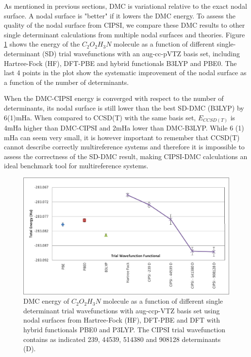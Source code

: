 As mentioned in previous sections, DMC is variational relative to the
exact nodal surface. A nodal surface is "better" if it lowers the DMC
energy. To assess the quality of the nodal surface from CIPSI, we
compare these DMC results to other single determinant calculations
from multiple nodal surfaces and theories. Figure \ref{fig:CIPSI-DMC}
shows the energy of the $C_2O_2H_3N$ molecule as a function of
different single-determinant (SD) trial wavefunctions with an
aug-cc-pVTZ basis set, including Hartree-Fock (HF), DFT-PBE and hybrid
functionals B3LYP and PBE0. The last 4 points in the plot show the
systematic improvement of the nodal surface as a function of the
number of determinants. 

When the DMC-CIPSI energy is converged with respect to the number of
determinants, its nodal surface is still lower than the best SD-DMC
(B3LYP) by 6(1)mHa. When compared to CCSD(T) with the same basis set,
$E_{CCSD(T)}$ is 4mHa higher than DMC-CIPSI and 2mHa lower than
DMC-B3LYP. While 6 (1) mHa can seem very small, it is however
important to remember that CCSD(T) cannot describe correctly
multireference systems and therefore it is impossible to assess the
correctness of the SD-DMC result, making CIPSI-DMC calculations an
ideal benchmark tool for multireference systems.

\begin{figure}
\begin{center}
\includegraphics[trim = 2mm 2mm 2mm 2mm, clip,width=0.9
\columnwidth]{figures/DMC-Multidet.jpg}
\end{center}
\caption{DMC energy of $C_2O_2H_3N$ molecule as a function of different single determinant trial wavefunctions with aug-ccp-VTZ basis set using nodal surfaces from Hartree-Fock (HF), DFT-PBE and DFT with hybrid functionals PBE0 and P3LYP. The CIPSI trial wavefunction contains as indicated 239, 44539, 514380 and 908128 determinants (D). 
\label{fig:CIPSI-DMC}
}
\end{figure}
